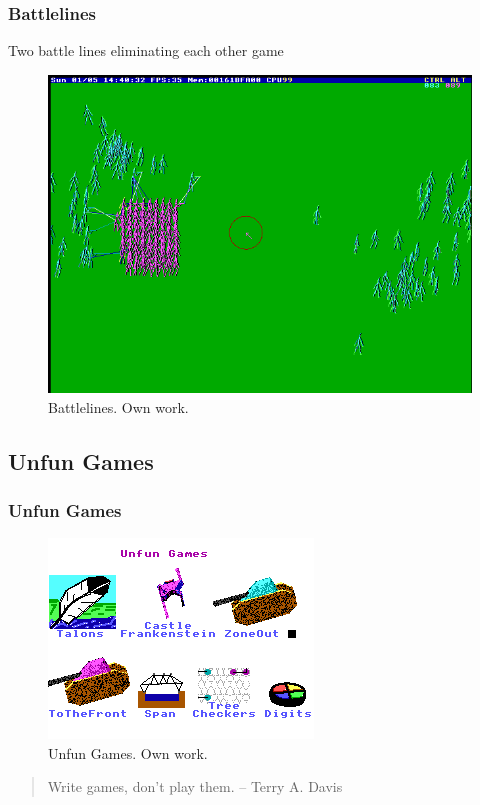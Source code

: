 \documentclass{beamer}
\begin{document}
	\begin{frame}
		\frametitle{Battlelines}
		Two battle lines eliminating each other game
		\begin{figure}
			\centering
			\includegraphics[width=0.6\linewidth]{images/battle_lines.png}
			\caption{Battlelines. Own work.}
			\label{fig:ebattle_lines}
		\end{figure}
	\end{frame}

	\subsection{Unfun Games}
	\begin{frame}
		\frametitle{Unfun Games}
		\begin{figure}
			\centering
			\includegraphics[width=0.5\linewidth]{images/unfun_games.png}
			\caption{Unfun Games. Own work.}
			\label{fig:unfun_games}
		\end{figure}
		\vspace{0.5em}

		\begin{quote}
			Write games, don't play them. \flushright -- Terry A. Davis
		\end{quote}
	\end{frame}
\end{document}
